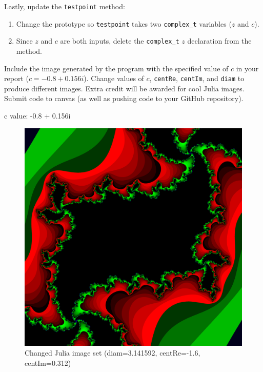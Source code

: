 \documentclass{article}
\begin{document}
\noindent Lastly, update the \texttt{testpoint} method:
\begin{enumerate}
    \item Change the prototype so \texttt{testpoint} takes two \texttt{complex\_t} variables ($z$ and $c$).
    \item Since $z$ and $c$ are both inputs, delete the \texttt{complex\_t} $z$ declaration from the method.
\end{enumerate}
\vspace{1em}

\noindent Include the image generated by the program with the specified value of $c$ in your report ($c = -0.8 + 0.156 i$). Change values of $c$, \texttt{centRe}, \texttt{centIm}, and \texttt{diam} to produce different images. Extra credit will be awarded for cool Julia images. Submit code to canvas (as well as pushing code to your GitHub repository).

c value: -0.8 + 0.156i

\begin{figure}[h!]
    \centering
    \includegraphics[scale=0.05]{julia_default.png}
    \caption{Changed Julia image set (diam=3.141592, centRe=-1.6, centIm=0.312)}
    \label{fig:default_julia}
\end{figure}
\end{document}
